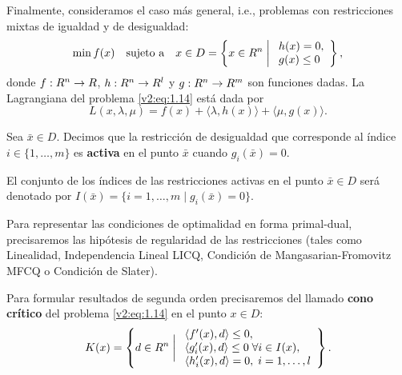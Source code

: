 Finalmente, consideramos el caso más general, i.e., problemas con restricciones mixtas de igualdad y de desigualdad:
\begin{equation}
    \min f(x) \quad \text{sujeto a} \quad x \in D = \left\{ x \in R^n \mathrel{\bigg|} \begin{array}{l} h(x) = 0, \\ g(x) \le 0 \end{array} \right\},
    \label{v2:eq:1.14}
\end{equation}
donde $f : R^n \to R$, $h : R^n \to R^l$ y $g : R^n \to R^m$ son funciones dadas. La Lagrangiana del problema \eqref{v2:eq:1.14} está dada por
\[
    L(x, \lambda, \mu) = f(x) + \langle \lambda, h(x) \rangle + \langle \mu, g(x) \rangle.
\]

\begin{definition}\label{v2:def:1.2.1}
    Sea $\bar{x} \in D$. Decimos que la restricción de desigualdad que corresponde al índice $i \in \{1, \dots, m\}$ es \textbf{activa} en el punto $\bar{x}$ cuando $g_i(\bar{x}) = 0$.
\end{definition}

El conjunto de los índices de las restricciones activas en el punto $\bar{x} \in D$ será denotado por $I(\bar{x}) = \{i = 1, \dots, m \mid g_i(\bar{x}) = 0\}$.

Para representar las condiciones de optimalidad en forma primal-dual, precisaremos las hipótesis de regularidad de las restricciones (tales como Linealidad, Independencia Lineal LICQ, Condición de Mangasarian-Fromovitz MFCQ o Condición de Slater).

Para formular resultados de segunda orden precisaremos del llamado \textbf{cono crítico} del problema \eqref{v2:eq:1.14} en el punto $x \in D$:
\begin{equation}
    K(x) = \left\{ d \in R^n \mathrel{\bigg|} \begin{array}{l} \langle f'(x), d \rangle \le 0, \\ \langle g'_i(x), d \rangle \le 0 \; \forall i \in I(x), \\ \langle h'_i(x), d \rangle = 0, \; i = 1, \dots, l \end{array} \right\}.
    \label{v2:eq:1.19}
\end{equation}


